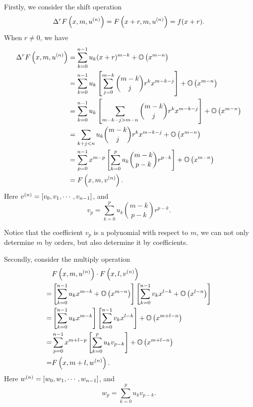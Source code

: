 Firstly, we consider the shift operation
\begin{equation}
\Delta^r F\left(x,m,u^{(n)}\right) = F\left(x+r,m,u^{(n)}\right) = f(x+r).
\end{equation}
When $r\neq 0$, we have
\begin{equation}
\begin{split}
\Delta^r F\left(x,m,u^{(n)}\right) &= \sum_{k=0}^{n-1}{u_k (x+r)^{m-k}}+\mathbb O\left(x^{m-n}\right) \\
&= \sum_{k=0}^{n-1}{u_k \left[\sum_{j=0}^{m-k}{\binom{m-k}{j}r^kx^{m-k-j}}\right]}+\mathbb O\left(x^{m-n}\right) \\
&= \sum_{k=0}^{n-1}{u_k \left[\sum_{m-k-j>m-n}{\binom{m-k}{j}r^kx^{m-k-j}}\right]}+\mathbb O\left(x^{m-n}\right) \\
&= \sum_{k+j<n}{u_k {\binom{m-k}{j}r^kx^{m-k-j}}}+\mathbb O\left(x^{m-n}\right) \\
&=\sum_{p=0}^{n-1}{x^{m-p}\left[\sum_{k=0}^p{u_k\binom{m-k}{p-k}r^{p-k}}\right]}+\mathbb O\left(x^{m-n}\right)\\
&=F\left(x,m,v^{(n)}\right).
\end{split}
\end{equation}
Here $v^{(n)}=\left[v_0,v_1,\cdots,v_{n-1}\right]$, and
\begin{equation}
v_p=\sum_{k=0}^p{u_k\binom{m-k}{p-k}r^{p-k}}.
\end{equation}

Notice that the coefficient $v_p$ is a polynomial with respect to $m$, we can not only determine $m$ by orders, but also determine it by coefficients.

Secondly, consider the multiply operation
\begin{equation}
\begin{split}
& F\left(x,m,u ^{(n)}\right)\cdot F\left(x,l,v^{(n)}\right) \\
=& \left[\sum_{k=0}^{n-1}{u_k x^{m-k}}+\mathbb O\left(x^{m-n}\right)\right]\left[\sum_{k=0}^{n-1}{v_k x^{l-k}}+\mathbb O\left(x^{l-n}\right)\right] \\
=& \left[\sum_{k=0}^{n-1}{u_k x^{m-k}}\right]\left[\sum_{k=0}^{n-1}{v_k x^{l-k}}\right]+\mathbb O\left(x^{m+l-n}\right) \\
=& \sum_{p=0}^{n-1}{x^{m+l-p}\left[\sum_{k=0}^p{u_k v_{p-k}}\right]}+\mathbb O\left(x^{m+l-n}\right) \\
=& F\left(x,m+l,w^{(n)}\right) .
\end{split}
\end{equation}
Here $w^{(n)}=\left[w_0,w_1,\cdots,w_{n-1}\right]$, and
\begin{equation}
w_p=\sum_{k=0}^p{u_k v_{p-k}}.
\end{equation}

